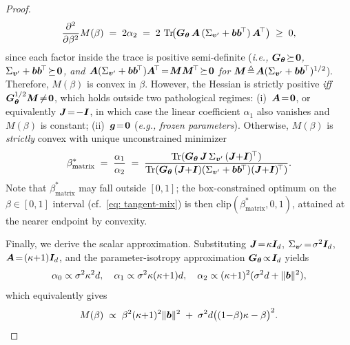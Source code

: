 \begin{appendices}
\begin{proof}
        \begin{equation}
            \frac{\partial^{2}}{\partial \beta^{2}}M(\beta) \;=\; 2\alpha_{2} \;=\; 2\,\operatorname{Tr}\!\bigl({\bm{G}}_{{\bm{\theta}}}\,{\bm{A}}\,(\Sigma_{{\bm{v}}^{\prime}}+{\bm{b}}{\bm{b}}^{\!\top})\,{\bm{A}}^{\!\top}\bigr) \;\geq\; 0,
        \end{equation}
        since each factor inside the trace is positive semi-definite (\emph{i.e., ${\bm{G}}_{{\bm{\theta}}}\!\succeq\!\bm{0}$, $\Sigma_{{\bm{v}}^{\prime}}+{\bm{b}}{\bm{b}}^{\!\top}\!\succeq\!\bm{0}$, and ${\bm{A}}(\Sigma_{{\bm{v}}^{\prime}}+{\bm{b}}{\bm{b}}^{\!\top}){\bm{A}}^{\!\top}\!=\!{\bm{M}}{\bm{M}}^{\!\top}\!\succeq\!\bm{0}$ for ${\bm{M}}\!\triangleq\!{\bm{A}}(\Sigma_{{\bm{v}}^{\prime}}+{\bm{b}}{\bm{b}}^{\!\top})^{1/2}$}). Therefore, $M(\beta)$ is convex in $\beta$. However, the Hessian is strictly positive \emph{iff} ${\bm{G}}_{{\bm{\theta}}}^{1/2}{\bm{M}}\!\neq\!\bm{0}$, which holds outside two pathological regimes: (i)~${\bm{A}}\!=\!\bm{0}$, or equivalently ${\bm{J}}\!=\!-{\bm{I}}$, in which case the linear coefficient $\alpha_{1}$ also vanishes and $M(\beta)$ is constant; (ii)~${\bm{g}}\!=\!\bm{0}$ (\emph{e.g., frozen parameters}). Otherwise, $M(\beta)$ is \emph{strictly} convex with unique unconstrained minimizer
        \begin{equation}
            \beta^{\ast}_{\text{matrix}} \;=\; \frac{\alpha_{1}}{\alpha_{2}} \;=\; \frac{\operatorname{Tr}({\bm{G}}_{{\bm{\theta}}}\,{\bm{J}}\,\Sigma_{{\bm{v}}^{\prime}}\,({\bm{J}}{+}{\bm{I}})^{\!\top})}{\operatorname{Tr}({\bm{G}}_{{\bm{\theta}}}\,({\bm{J}}{+}{\bm{I}})(\Sigma_{{\bm{v}}^{\prime}}+{\bm{b}}{\bm{b}}^{\!\top})({\bm{J}}{+}{\bm{I}})^{\!\top})}.
            \label{eq: beta-star-matrix}
        \end{equation}
        Note that $\beta^{\ast}_{\text{matrix}}$ may fall outside $[0,1]$; the box-constrained optimum on the $\beta\!\in\![0,1]$ interval (cf.~\eqref{eq: tangent-mix}) is then $\mathrm{clip}(\beta^{\ast}_{\text{matrix}},0,1)$, attained at the nearer endpoint by convexity.

        Finally, we derive the scalar approximation. Substituting ${\bm{J}}\!=\!\kappa{\bm{I}}_{d}$, $\Sigma_{{\bm{v}}^{\prime}}\!=\!\sigma^{2}{\bm{I}}_{d}$, ${\bm{A}}\!=\!(\kappa{+}1){\bm{I}}_{d}$, and the parameter-isotropy approximation ${\bm{G}}_{{\bm{\theta}}}\!\propto\!{\bm{I}}_{d}$ yields
        \begin{equation*}
            \alpha_{0}\propto\sigma^{2}\kappa^{2}d,\quad
            \alpha_{1}\propto\sigma^{2}\kappa(\kappa{+}1)d,\quad
            \alpha_{2}\propto(\kappa{+}1)^{2}(\sigma^{2}d+\|{\bm{b}}\|^{2}),
        \end{equation*}
        which equivalently gives
        \begin{equation}
            M(\beta) \;\propto\; \beta^{2}(\kappa{+}1)^{2}\|{\bm{b}}\|^{2} \;+\; \sigma^{2}d\bigl((1{-}\beta)\kappa - \beta\bigr)^{2}.
        \end{equation}


\end{proof}
\end{appendices}
